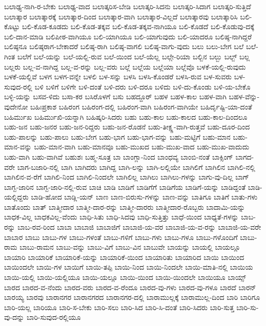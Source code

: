 {ಬಲಾಢ್ಯ-ನಾಗಿ-ರ-ಬೇಕು
ಬಲಾಢ್ಯ-ವಾದ
ಬಲಾತ್ಕರಿಸ-ಬೇಡಿ
ಬಲಾತ್ಕರಿ-ಸಿದನು
ಬಲಾತ್ಕರಿ-ಸಿದಾಗ
ಬಲಾತ್ಕರಿ-ಸುತ್ತಿದೆ
ಬಲಾತ್ಕಾರ
ಬಲಾತ್ಕಾರಕ್ಕೆ
ಬಲಾತ್ಕಾರ-ದಿಂದ
ಬಲಾತ್ಕಾರ-ವಾಗಿ
ಬಲಾತ್ಕಾರ-ವಿಲ್ಲದೆ
ಬಲಾತ್ಕಾರವು
ಬಲಾತ್ಕಾರಿಸಿ
ಬಲಿ-ಕೊಟ್ಟು
ಬಲಿ-ಕೊಡ-ಕೂಡದು
ಬಲಿ-ಕೊಡ-ತಕ್ಕವ
ಬಲಿ-ಕೊಡ-ತಕ್ಕವ-ನಾಗಿಯೂ
ಬಲಿ-ಕೊಡದೆ
ಬಲಿ-ಕೊಡುವು-ದಕ್ಕೆ
ಬಲಿ-ದಾನ-ಮಾಡಿ
ಬಲಿಪೀಠ-ವಾಗಿಯೂ
ಬಲಿ-ಯಾಗಿಯೂ
ಬಲಿ-ಯಾಗುವುದು
ಬಲಿ-ಯಾದರೂ
ಬಲಿಷ್ಠ-ನಾಗಿದ್ದರೆ
ಬಲಿಷ್ಠನೂ
ಬಲಿಷ್ಠರಾಗ-ಬೇಕಾದರೆ
ಬಲಿಷ್ಠ-ರಾಗಿ
ಬಲಿಷ್ಠ-ವಾಗಲಿ
ಬಲಿಷ್ಠ-ವಾಗು-ವುದು
ಬಲು
ಬಲು-ಬೇಗ
ಬಲೆ
ಬಲೆ-ಗಿಂತ
ಬಲೆಗೆ
ಬಲೆ-ಯನ್ನು
ಬಲೆ-ಯಲ್ಲಿ-ರುವ
ಬಲೆ-ಯಿಂದ
ಬಲೆ-ಯೆಲ್ಲ
ಬಲ್ಗೇ-ರಿಯಾ
ಬಲ್ಬಿನ
ಬಲ್ಬು
ಬಲ್ಬ್
ಬಲ್ಲ
ಬಲ್ಲರು
ಬಲ್ಲ-ವ-ನಾಗಿದ್ದ
ಬಲ್ಲ-ವ-ರನ್ನು
ಬಲ್ಲ-ವರು
ಬಲ್ಲೆ
ಬಲ್ಲೆಯ
ಬಲ್ಲೆಯಾ
ಬಲ್ಲೆವೊ
ಬಳಕೆ-ಯಲ್ಲಿ-ರುವುದು
ಬಳಕೆ-ಯಲ್ಲಿವೆ
ಬಳಗ
ಬಳಗ-ವನ್ನೇ
ಬಳಲಿ
ಬಳ-ಸನ್ನು
ಬಳಸಿ
ಬಳಸಿ-ಕೊಂಡರೆ
ಬಳಸಿ-ರುವ
ಬಳ-ಸುವರು
ಬಳ-ಸುವುದ-ರಲ್ಲಿ
ಬಳಿ
ಬಳಿಗೆ
ಬಳಿಗೇ
ಬಳಿ-ದಂತೆ
ಬಳಿ-ದರು
ಬಳಿ-ದರೂ
ಬಳಿದು
ಬಳಿ-ದು-ಕೊಂಡು
ಬಳಿ-ಯ-ಬೇಕೊ
ಬಳ್ಳಿ-ಯನ್ನು
ಬಸವ-ಳಿದು
ಬಸಾ-ಕರ
ಬಸಿರೊಳಗೆ
ಬಸು
ಬಹದ್ದೂರ್
ಬಹಳ
ಬಹಳ-ಕಾಲ
ಬಹಳ-ವಾಗಿ
ಬಹಳ-ವೆನ್ನು-ವುದೇನೋ
ಬಹಿಃಪ್ರಕಾಶ
ಬಹಿರಂಗ
ಬಹಿರಂಗ-ದಲ್ಲಿ
ಬಹಿರಂಗ-ವಾಗಿ
ಬಹಿರಂಗ-ವಾಗಿಯೇ
ಬಹಿರ್ದೃಷ್ಟಿ-ಯಾ-ದಂತೆ
ಬಹಿರ್ಮುಖ
ಬಹಿರ್ಮುಖಿ-ಯನ್ನಾಗಿ
ಬಹಿಷ್ಕರಿ-ಸಿದರು
ಬಹು
ಬಹು-ಕಾಲ
ಬಹು-ಕಾಲದ
ಬಹು-ಕಾಲ-ದಿಂದಲೂ
ಬಹು-ಜನ
ಬಹು-ಜನರ
ಬಹು-ಜನ-ರಿದ್ದರು
ಬಹು-ಜನ-ರೊಡನೆ
ಬಹು-ತೀಕ್ಷ್ಣ-ವಾಗಿ-ರುತ್ತವೆ
ಬಹು-ದೂರ-ದಿಂದ
ಬಹು-ಪಾಲನ್ನು
ಬಹು-ಪಾಲು
ಬಹು-ಬೇಗ
ಬಹು-ಭಾಗ
ಬಹು-ಭಾಗ-ವನ್ನು
ಬಹು-ಮಟ್ಟಿಗೆ
ಬಹು-ಮಾನ
ಬಹು-ಮಾನ-ವನ್ನು
ಬಹು-ಮಾನ-ವಾಗಿ
ಬಹು-ಮಾನವೂ
ಬಹು-ಮುಖದ
ಬಹು-ಮುಖ-ವಾದ
ಬಹು-ಮುಖ-ವಾದುದು
ಬಹು-ವಾಗಿ
ಬಹು-ವಾಗಿವೆ
ಬಹುಶಃ
ಬಹ್ಮ-ಸೂತ್ರ
ಬಾ
ಬಾಂಗ್ಲಾ-ನಿಂದ
ಬಾಂಧವ್ಯ
ಬಾಂಬಿ-ನಂತೆ
ಬಾಕ್ಸಿಂಗ್
ಬಾಗದ-ವರೇ
ಬಾಗ-ಬಜಾರಿ-ನಲ್ಲಿ
ಬಾಗಿ
ಬಾಗಿದರು
ಬಾಗಿದ್ದ
ಬಾಗಿ-ಲನ್ನು
ಬಾಗಿ-ಲಲ್ಲಿಯೇ
ಬಾಗಿಲಿಗೆ
ಬಾಗಿಲಿನ
ಬಾಗಿಲಿ-ನಲ್ಲಿ
ಬಾಗಿಲಿನ-ವ-ರೆಗೆ
ಬಾಗಿಲಿ-ನಿಂದ
ಬಾಗಿಲಿ-ನಿಂದಲೇ
ಬಾಗಿಲಿಲ್ಲ
ಬಾಗಿಲು
ಬಾಗಿಲು-ಗಳನ್ನು
ಬಾಗು-ವು-ದಿಲ್ಲ
ಬಾಗ್
ಬಾಗ್ಬ-ಜಾರಿನ
ಬಾಗ್ಬ-ಜಾರಿ-ನಲ್ಲಿ-ರುವ
ಬಾಚಿ
ಬಾಡಿ
ಬಾಡಿಗೆ
ಬಾಡಿಗೆಗೆ
ಬಾಡಿಗೆಯ
ಬಾಡಿಗೆ-ಯನ್ನು
ಬಾಡಿದ್ದಂತೆ
ಬಾಡಿ-ಯಲ್ಲಿದ್ದರು
ಬಾಡಿ-ಹೋದ
ಬಾಡ್ಲಿ-ಯನ್
ಬಾಣ
ಬಾಣ-ಬಿರುಸು-ಗಳನ್ನು
ಬಾಣ-ವನ್ನು
ಬಾತಿಗೂ
ಬಾತಿಗೆ
ಬಾತು-ಗಳು
ಬಾತೊಂದು
ಬಾತ್
ಬಾತ್ಮೀದಾರ
ಬಾತ್ಮೀ-ದಾರ-ರನ್ನು
ಬಾತ್ಮೀ-ದಾರರು
ಬಾತ್ಮೀದಾರ-ರೊಬ್ಬರು
ಬಾದಾಮಿ-ಯನ್ನು
ಬಾಧಕ-ವಿಲ್ಲ
ಬಾಧಕವಿಲ್ಲ-ವೆಂದು
ಬಾಧಿ-ಸಿತು
ಬಾಧಿ-ಸಿದವು
ಬಾಧಿ-ಸುತ್ತಿತ್ತು
ಬಾಧೆ-ಯಿಂದ
ಬಾಧ್ಯತೆ-ಗಳನ್ನು
ಬಾಬ-ರನ್ನು
ಬಾಬ-ರವ-ರಿಂದ
ಬಾಬಾ
ಬಾಬಾಜಿ
ಬಾಬಾಜಿಗೆ
ಬಾಬಾಜಿ-ಯ-ವರ
ಬಾಬಾಜಿ-ಯ-ವ-ರನ್ನು
ಬಾಬಾಜಿ-ಯ-ವರೇ
ಬಾಬಾರ
ಬಾಬು
ಬಾಬು-ಗಳ
ಬಾಬು-ಗಳಂತೆ
ಬಾಬು-ಗಳಿಗೆ
ಬಾಬು-ಗಳು
ಬಾಬು-ಗಳೂ
ಬಾಬು-ಗಳೊಂದಿಗೆ
ಬಾಬು-ರಾಮ
ಬಾಬು-ರಾಮನ
ಬಾಬು-ವನ್ನು
ಬಾಬು-ವಿಗೆ
ಬಾಬು-ವಿನ
ಬಾಬುವೇ
ಬಾಯನ್ನು
ಬಾಯಲ್ಲಿ
ಬಾಯಲ್ಲೂ
ಬಾಯಾರಿ
ಬಾಯಾರಿಕೆ
ಬಾಯಾರಿಕೆ-ಯನ್ನು
ಬಾಯಾರಿಕೆ-ಯಿಂದ
ಬಾಯಾರಿತು
ಬಾಯಾರಿದ
ಬಾಯಿ
ಬಾಯಿಂದ
ಬಾಯಿಂದಲೇ
ಬಾಯಿ-ಗಳ
ಬಾಯಿಗೆ
ಬಾಯಿ-ತಪ್ಪಿ
ಬಾಯಿ-ನಿಂದ
ಬಾಯಿ-ನಿಂದಲೇ
ಬಾಯಿ-ಮಾತಿ-ನಲ್ಲಿ
ಬಾಯಿಯ
ಬಾಯಿ-ಯಲ್ಲಿ
ಬಾಯಿ-ಯಲ್ಲಿಯೂ
ಬಾಯಿ-ಯಲ್ಲೂ
ಬಾಯಿ-ಯಿಂದ
ಬಾಯಿ-ಯಿಂದಲೇ
ಬಾಯಿಯೂ
ಬಾಯ್ಸ್
ಬಾರದ
ಬಾರದ-ವ-ನೆಂದು
ಬಾರದ-ವರು
ಬಾರದ-ವ-ರೆಂದೂ
ಬಾರದ-ವು-ಗಳು
ಬಾರದ-ವು-ಗಳೂ
ಬಾರದೆ
ಬಾರನ್
ಬಾರಯ್ಯ
ಬಾರವು
ಬಾರಾನಗರ
ಬಾರಾನಗರದ
ಬಾರಾನಗರ-ದಲ್ಲಿ
ಬಾರಾಮುಲ್ಲಕ್ಕೆ
ಬಾರಾಮುಲ್ಲ-ದಿಂದ
ಬಾರಿ
ಬಾರಿಗೂ
ಬಾರಿ-ಯಲ್ಲ
ಬಾರಿಯೂ
ಬಾರಿ-ಸ-ಬೇಕು
ಬಾರಿ-ಸಲು
ಬಾರಿ-ಸಿದ
ಬಾರಿ-ಸಿ-ದಂತೆ
ಬಾರಿ-ಸಿದರು
ಬಾರಿ-ಸುತ್ತ
ಬಾರಿ-ಸು-ವು-ದನ್ನು
ಬಾರಿ-ಸುವುದ-ರಲ್ಲಿಯೂ
}
